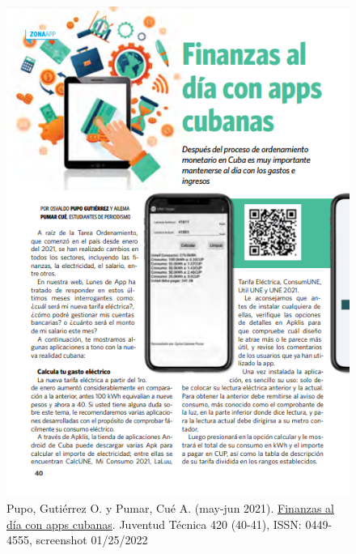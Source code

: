 \documentclass{article}
\begin{document}
\begin{figure}[h]
    \includegraphics[width=\textwidth]{images/laluu_jt.png}
    \caption{Pupo, Gutiérrez O. y Pumar, Cué A. (may-jun 2021). \href{http://www.juventudtecnica.cu/sites/default/files/jt_420.pdf}{Finanzas al día con apps cubanas}. Juventud Técnica 420 (40-41), ISSN: 0449-4555, screenshot 01/25/2022}
    \label{sec:laluu_press}
\end{figure}
\end{document}
